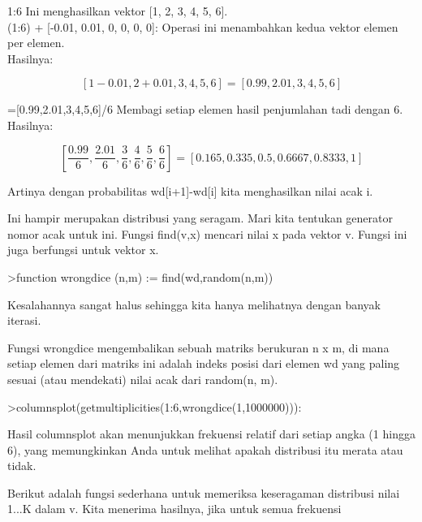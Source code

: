 \documentclass{article}
\begin{document}
\begin{eulernotebook}
\begin{eulercomment}
\begin{eulercomment}
\begin{eulercomment}
1:6 Ini menghasilkan vektor [1, 2, 3, 4, 5, 6].\\
(1:6) + [-0.01, 0.01, 0, 0, 0, 0]: Operasi ini menambahkan kedua
vektor elemen per elemen.\\
Hasilnya: \\
\end{eulercomment}
\begin{eulerformula}
\[
[1-0.01, 2+0.01, 3, 4, 5, 6] = [0.99, 2.01, 3, 4, 5, 6]
\]
\end{eulerformula}
\begin{eulercomment}
[1-0.01,2+0.01,3,4,5,6]=[0.99,2.01,3,4,5,6]/6 Membagi setiap elemen
hasil penjumlahan tadi dengan 6.\\
Hasilnya:\\
\end{eulercomment}
\begin{eulerformula}
\[
[\frac {0.99}{6}, \frac {2.01}{6}, \frac {3}{6}, \frac {4}{6}, \frac {5}{6}, \frac {6}{6}] = [0.165, 0.335, 0.5,0.6667, 0.8333, 1]
\]
\end{eulerformula}
\begin{eulercomment}
Artinya dengan probabilitas wd[i+1]-wd[i] kita menghasilkan nilai acak
i.

Ini hampir merupakan distribusi yang seragam. Mari kita tentukan
generator nomor acak untuk ini. Fungsi find(v,x) mencari nilai x pada
vektor v. Fungsi ini juga berfungsi untuk vektor x.
\end{eulercomment}
\begin{eulerprompt}
>function wrongdice (n,m) := find(wd,random(n,m))
\end{eulerprompt}
\begin{eulercomment}
Kesalahannya sangat halus sehingga kita hanya melihatnya dengan banyak
iterasi.

Fungsi wrongdice mengembalikan sebuah matriks berukuran n x m, di mana
setiap elemen dari matriks ini adalah indeks posisi dari elemen wd
yang paling sesuai (atau mendekati) nilai acak dari random(n, m).
\end{eulercomment}
\begin{eulerprompt}
>columnsplot(getmultiplicities(1:6,wrongdice(1,1000000))):
\end{eulerprompt}
\begin{eulercomment}
Hasil columnsplot akan menunjukkan frekuensi relatif dari setiap angka
(1 hingga 6), yang memungkinkan Anda untuk melihat apakah distribusi
itu merata atau tidak.

Berikut adalah fungsi sederhana untuk memeriksa keseragaman distribusi
nilai 1...K dalam v. Kita menerima hasilnya, jika untuk semua
frekuensi


\end{eulercomment}
\end{eulercomment}
\end{eulercomment}
\end{eulernotebook}
\end{document}
